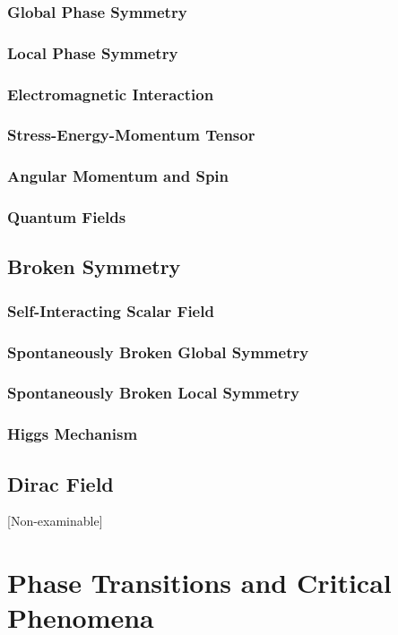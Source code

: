 \documentclass[a4paper]{article}
\theoremstyle{new}
\begin{document}
\subsubsection{Global Phase Symmetry}
\subsubsection{Local Phase Symmetry}
\subsubsection{Electromagnetic Interaction}
\subsubsection{Stress-Energy-Momentum Tensor}
\subsubsection{Angular Momentum and Spin}
\newpage
\subsubsection{Quantum Fields}
\newpage
\subsection{Broken Symmetry}
\subsubsection{Self-Interacting Scalar Field}
\subsubsection{Spontaneously Broken Global Symmetry}
\subsubsection{Spontaneously Broken Local Symmetry}
\subsubsection{Higgs Mechanism}
\newpage
\subsection{Dirac Field}
[Non-examinable]
\newpage
\section{Phase Transitions and Critical Phenomena}
\end{document}
